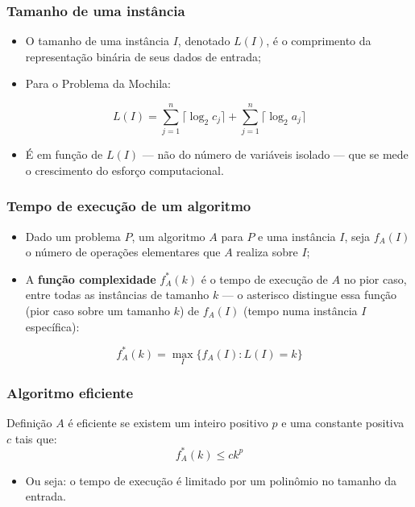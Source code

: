 \documentclass[fleqn]{beamer}
\begin{document}
\begin{frame}
	\frametitle{Tamanho de uma instância}
	\begin{itemize}
		\item O tamanho de uma instância $I$, denotado $L(I)$, é o
			comprimento da representação binária de seus dados de entrada;
		\item Para o Problema da Mochila:
	\end{itemize}
	$$
		L(I) = \sum_{j=1}^{n}\lceil \log_2 c_j \rceil + \sum_{j=1}^{n}
		\lceil \log_2 a_j \rceil
	$$
	\begin{itemize}
		\item É em função de $L(I)$ — não do número de variáveis isolado —
			que se mede o crescimento do esforço computacional.
	\end{itemize}
\end{frame}

\begin{frame}
	\frametitle{Tempo de execução de um algoritmo}
	\begin{itemize}
		\item Dado um problema $P$, um algoritmo $A$ para $P$ e uma
			instância $I$, seja $f_A(I)$ o número de operações elementares
			que $A$ realiza sobre $I$;
		\item A \textbf{função complexidade} $f_A^*(k)$ é o tempo de
			execução de $A$ no pior caso, entre todas as instâncias de
			tamanho $k$ — o asterisco distingue essa função (pior caso
			sobre um tamanho $k$) de $f_A(I)$ (tempo numa instância
			$I$ específica):
	\end{itemize}
	$$
		f_A^*(k) = \max_I \{f_A(I) : L(I) = k\}
	$$
\end{frame}

\begin{frame}
	\frametitle{Algoritmo eficiente}
	\begin{block}{Definição}
		$A$ é eficiente se existem um inteiro positivo $p$ e uma constante
		positiva $c$ tais que:
		$$
			f_A^*(k) \leq ck^p
		$$
	\end{block}
	\begin{itemize}
		\item Ou seja: o tempo de execução é limitado por um polinômio no
			tamanho da entrada.
	\end{itemize}
\end{frame}
\end{document}
